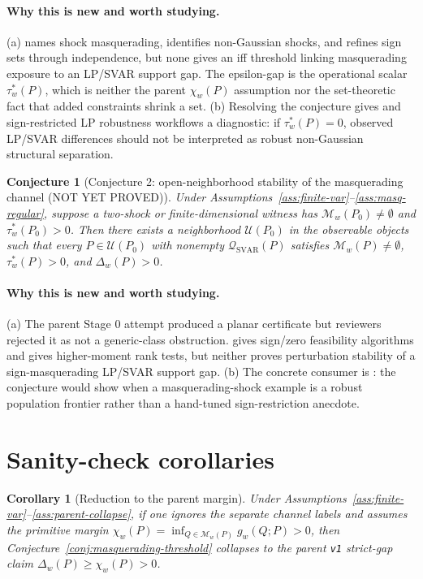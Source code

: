 \documentclass[11pt]{article}
\theoremstyle{definition}
\theoremstyle{plain}
\newtheorem{conjecture}{Conjecture}
\newtheorem{corollary}{Corollary}
\theoremstyle{remark}
\begin{document}
\paragraph{Why this is new and worth studying.}
(a) \citet{Wolf2022} names shock masquerading, \citet{LanneMeitzSaikkonen2017} identifies non-Gaussian shocks, and \citet{DrautzburgWright2023} refines sign sets through independence, but none gives an iff threshold linking masquerading exposure to an LP/SVAR support gap.  The epsilon-gap is the operational scalar \(\tau_w^*(P)\), which is neither the parent \(\chi_w(P)\) assumption nor the set-theoretic fact that added constraints shrink a set.  (b) Resolving the conjecture gives \citet{DrautzburgWright2023} and sign-restricted LP robustness workflows a diagnostic: if \(\tau_w^*(P)=0\), observed LP/SVAR differences should not be interpreted as robust non-Gaussian structural separation.

\begin{conjecture}[Conjecture 2: open-neighborhood stability of the masquerading channel (NOT YET PROVED)]\label{conj:generic-open-channel}
Under Assumptions~\ref{ass:finite-var}--\ref{ass:masq-regular}, suppose a two-shock or finite-dimensional witness has \(\mathcal M_w(P_0)\ne\emptyset\) and \(\tau_w^*(P_0)>0\).  Then there exists a neighborhood \(\mathcal U(P_0)\) in the observable objects such that every \(P\in\mathcal U(P_0)\) with nonempty \(\mathcal Q_{\mathrm{SVAR}}(P)\) satisfies \(\mathcal M_w(P)\ne\emptyset\), \(\tau_w^*(P)>0\), and \(\Delta_w(P)>0\).
\end{conjecture}
\paragraph{Why this is new and worth studying.}
(a) The parent Stage 0 attempt produced a planar certificate but reviewers rejected it as not a generic-class obstruction.  \citet{Read2022} gives sign/zero feasibility algorithms and \citet{Guay2021} gives higher-moment rank tests, but neither proves perturbation stability of a sign-masquerading LP/SVAR support gap.  (b) The concrete consumer is \citet{Wolf2022}: the conjecture would show when a masquerading-shock example is a robust population frontier rather than a hand-tuned sign-restriction anecdote.

\section{Sanity-check corollaries}
\begin{corollary}[Reduction to the parent margin]\label{cor:parent-reduction}
Under Assumptions~\ref{ass:finite-var}--\ref{ass:parent-collapse}, if one ignores the separate channel labels and assumes the primitive margin \(\chi_w(P)=\inf_{Q\in\mathcal M_w(P)}g_w(Q;P)>0\), then Conjecture~\ref{conj:masquerading-threshold} collapses to the parent \texttt{v1} strict-gap claim \(\Delta_w(P)\ge\chi_w(P)>0\).
\end{corollary}
\end{document}
